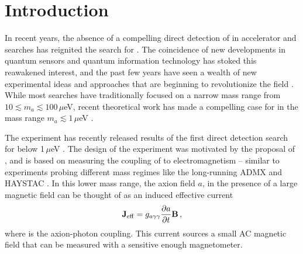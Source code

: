 \documentclass[aps,prd,amsmath,amssymb,reprint,superscriptaddress, nofootinbib,
]{revtex4-1}
\begin{document}
\newcommand{\Px}{\ensuremath{\bar{\mathcal{F}}}}
\newcommand{\Pten}{\ensuremath{\bar{\mathcal{F}}_\mathrm{10M}}\xspace}
\newcommand{\Pone}{\ensuremath{\bar{\mathcal{F}}_\mathrm{1M}}\xspace}
\newcommand{\Phun}{\ensuremath{\mathcal{F}_\mathrm{100k}}\xspace} 
\section{Introduction}
In recent years, the absence of a compelling direct detection of \DM in accelerator and \WIMP searches has reignited the search for \ADM. The coincidence of new developments in quantum sensors and quantum information technology has stoked this reawakened interest, and the past few years have seen a wealth of new experimental ideas and approaches that are beginning to revolutionize the field \cite{Marsh:2017hbv,Battaglieri:2017aum}. While most \ADM searches have traditionally focused on a narrow mass range from $10\lesssim m_a \lesssim 100\,\mu$eV, recent theoretical work has made a compelling case for \ADM in the mass range $m_a\lesssim 1\,\mu$eV \cite{Tegmark:2005dy,Davoudiasl:2015vba,Graham:2018jyp,Agrawal:2017eqm,2010PhRvD..81f3508V,Co:2016fln,DiLuzio:2018gqe,Arvanitaki:2009fg,Svrcek:2006yi,Agrawal:2017cmd,Farina:2016tgd}.

The \abra experiment has recently released results of the first direct detection search for \ADM below 1\,$\mu$eV \cite{ABRAFirstResults}. The design of the experiment was motivated by the proposal of \cite{ABRA2016}, and is based on measuring the coupling of \ADM to electromagnetism -- similar to experiments probing different mass regimes like the long-running ADMX \cite{Asztalos2001,ADMX2018} and HAYSTAC \cite{HAYSTAC2018a}. In this lower mass range, the axion field $a$, in the presence of a large magnetic field can be thought of as an induced effective current
\begin{equation}
\mathbf{J}_{\rm eff} = g_{a\gamma\gamma}\frac{\partial a}{\partial t} \mathbf{B}\,,
\label{eqn:EffectiveCurrent}
\end{equation}
where \gagg is the axion-photon coupling. This current sources a small AC magnetic field that can be measured with a sensitive enough magnetometer. 
\end{document}
